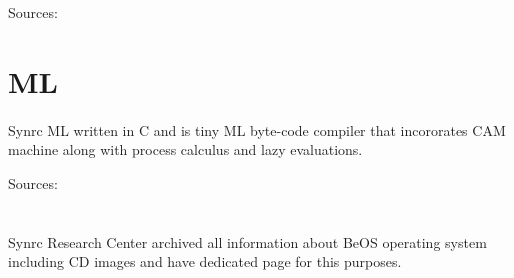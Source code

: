 \documentclass[11pt]{article}
\begin{document}
Sources: 



\section*{ML}
\paragraph{}
Synrc ML written in C and is tiny ML byte-code compiler that incororates CAM machine
along with process calculus and lazy evaluations.

Sources: 

\section*{}
\paragraph{}
Synrc Research Center archived all information about BeOS operating system 
including CD images and have dedicated page for this purposes.



\end{document}
